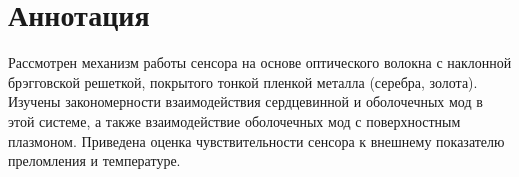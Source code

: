 

\section*{Аннотация}\label{asbract}

Рассмотрен механизм работы сенсора на основе оптического волокна с наклонной брэгговской решеткой, покрытого тонкой пленкой металла (серебра, золота). Изучены закономерности взаимодействия сердцевинной и оболочечных мод в этой системе, а также взаимодействие оболочечных мод с поверхностным плазмоном. Приведена оценка чувствительности сенсора к внешнему показателю преломления и температуре.


\pagebreak[4]